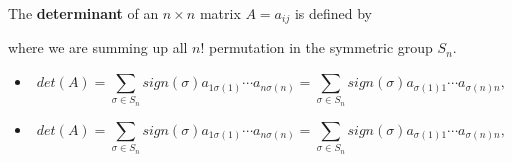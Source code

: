 \begin{refsection}
\begin{theorem}
	The \textbf{determinant} of an $n\times n$ matrix $A = a_{ij}$ is defined by
	
	where we are summing up all $n!$ permutation in the symmetric group $S_n$.
	\begin{itemize}
		\item $$det(A) = \sum_{\sigma \in S_n} sign(\sigma)a_{1\sigma(1)}\cdots a_{n\sigma(n)} = \sum_{\sigma \in S_n} sign(\sigma)a_{\sigma(1)1}\cdots a_{\sigma(n)n},$$
		\item $$det(A) = \sum_{\sigma \in S_n} sign(\sigma)a_{1\sigma(1)}\cdots a_{n\sigma(n)} = \sum_{\sigma \in S_n} sign(\sigma)a_{\sigma(1)1}\cdots a_{\sigma(n)n},$$
	\end{itemize}	
\end{theorem}


\end{refsection}
